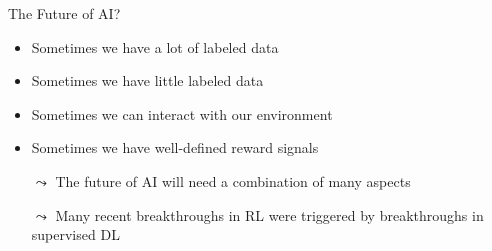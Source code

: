 \documentclass[aspectratio=169]{../latex_main/tntbeamer}  %
\begin{document}
\begin{frame}[c]{The Future of AI?}
	
	\begin{itemize}
		\item Sometimes we have a lot of labeled data
		\item Sometimes we have little labeled data
		\item Sometimes we can interact with our environment
		\item Sometimes we have well-defined reward signals
		\bigskip
		\pause
		\item[$\leadsto$] The future of AI will need a combination of many aspects
		\item[$\leadsto$] Many recent breakthroughs in RL were triggered by breakthroughs in supervised DL  
	\end{itemize}



\end{frame}
\end{document}
